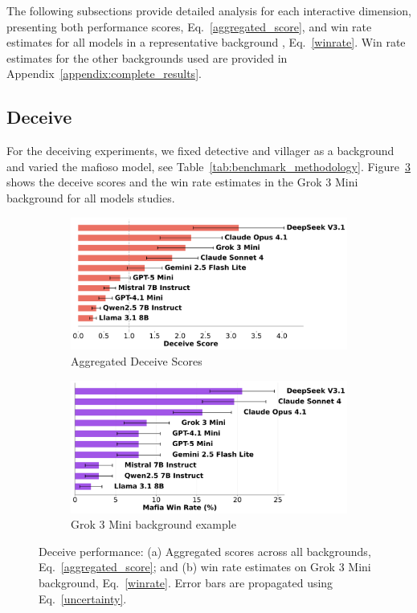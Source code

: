 \documentclass{article}
\begin{document}
The following subsections provide detailed analysis for each interactive dimension, presenting both performance scores, Eq.~\eqref{aggregated_score}, and win rate estimates for all models in a representative background , Eq.~\eqref{winrate}. Win rate estimates for the other backgrounds used are provided in Appendix~\ref{appendix:complete_results}.

\subsection{Deceive}

For the deceiving experiments, we fixed detective and villager as a background and varied the mafioso model, see Table~\ref{tab:benchmark_methodology}. Figure~\ref{fig:deceive_scores} shows the deceive scores and the win rate estimates in the Grok 3 Mini background for all models studies.

\begin{figure}[htbp]
    \centering
    \begin{subfigure}[b]{0.48\textwidth}
        \centering
        \includegraphics[width=\textwidth]{../results/mafioso_score_benchmark_exponential.png}
        \caption{Aggregated Deceive Scores}
        \label{fig:deceive_score}
    \end{subfigure}
    \hfill
    \begin{subfigure}[b]{0.48\textwidth}
        \centering
        \includegraphics[width=\textwidth]{../results/mafioso_grok_3_mini_db_benchmark.png}
        \caption{Grok 3 Mini background example}
        \label{fig:deceive_grok_example}
    \end{subfigure}
    \caption{Deceive performance: (a) Aggregated scores across all backgrounds, Eq.~\eqref{aggregated_score}; and (b) win rate estimates on Grok 3 Mini background, Eq.~\eqref{winrate}. Error bars are propagated using Eq.~\eqref{uncertainty}.}
    \label{fig:deceive_scores}
\end{figure}
\end{document}
